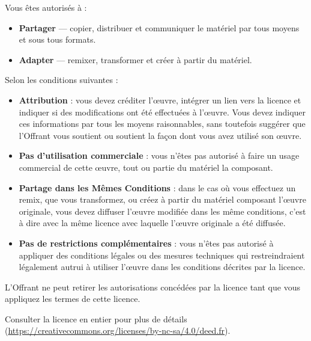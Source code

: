 \documentclass{article}
\begin{document}
\medskip

Vous êtes autorisés à :

\begin{itemize}
	\item \textbf{Partager} --- copier, distribuer et communiquer le matériel par tous moyens et sous tous formats.
	\item \textbf{Adapter} --- remixer, transformer et créer à partir du matériel.
\end{itemize}

\bigskip

Selon les conditions suivantes :

\begin{itemize}
	\item \textbf{Attribution} : vous devez créditer l'\oe{}uvre, intégrer un lien vers la licence et indiquer si des modifications ont été effectuées à l'\oe{}uvre. Vous devez indiquer ces informations par tous les moyens raisonnables, sans toutefois suggérer que l'Offrant vous soutient ou soutient la façon dont vous avez utilisé son \oe{}uvre. 
	\item \textbf{Pas d'utilisation commerciale} : vous n'êtes pas autorisé à faire un usage commercial de cette \oe{}uvre, tout ou partie du matériel la composant. 
	\item \textbf{Partage dans les Mêmes Conditions} : dans le cas où vous effectuez un remix, que vous transformez, ou créez à partir du matériel composant l'\oe{}uvre originale, vous devez diffuser l'\oe{}uvre modifiée dans les même conditions, c'est à dire avec la même licence avec laquelle l'\oe{}uvre originale a été diffusée.
	\item \textbf{Pas de restrictions complémentaires} : vous n'êtes pas autorisé à appliquer des conditions légales ou des mesures techniques qui restreindraient légalement autrui à utiliser l'\oe{}uvre dans les conditions décrites par la licence. 
\end{itemize}

\bigskip

L'Offrant ne peut retirer les autorisations concédées par la licence tant que vous appliquez les termes de cette licence.

\bigskip

Consulter la licence en entier pour plus de détails (\url{https://creativecommons.org/licenses/by-nc-sa/4.0/deed.fr}).

\newpage
\thispagestyle{empty}
\tableofcontents

\end{document}
